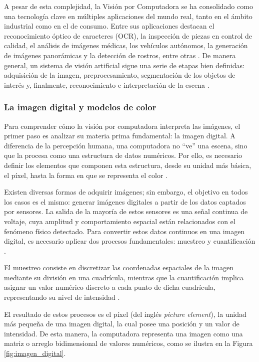 	A pesar de esta complejidad, la Visión por Computadora se ha consolidado como una tecnología clave en múltiples aplicaciones del mundo real, tanto en el ámbito industrial como en el de consumo. Entre sus aplicaciones destacan el reconocimiento óptico de caracteres (OCR), la inspección de piezas en control de calidad, el análisis de imágenes médicas, los vehículos autónomos, la generación de imágenes panorámicas y la detección de rostros, entre otras \cite{szeliski2022}. De manera general, un sistema de visión artificial sigue una serie de etapas bien definidas: adquisición de la imagen, preprocesamiento, segmentación de los objetos de interés y, finalmente, reconocimiento e interpretación de la escena \cite{cantero_vision}.
	
	\subsubsection{La imagen digital y modelos de color}
	
	Para comprender cómo la visión por computadora interpreta las imágenes, el primer paso es analizar su materia prima fundamental: la imagen digital. A diferencia de la percepción humana, una computadora no “ve” una escena, sino que la procesa como una estructura de datos numéricos. Por ello, es necesario definir los elementos que componen esta estructura, desde su unidad más básica, el píxel, hasta la forma en que se representa el color \cite{szeliski2022}.
	
	Existen diversas formas de adquirir imágenes; sin embargo, el objetivo en todos los casos es el mismo: generar imágenes digitales a partir de los datos captados por sensores. La salida de la mayoría de estos sensores es una señal continua de voltaje, cuya amplitud y comportamiento espacial están relacionados con el fenómeno físico detectado. Para convertir estos datos continuos en una imagen digital, es necesario aplicar dos procesos fundamentales: muestreo y cuantificación \cite{szeliski2022, gonzalez2018}.
	
	El muestreo consiste en discretizar las coordenadas espaciales de la imagen mediante su división en una cuadrícula, mientras que la cuantificación implica asignar un valor numérico discreto a cada punto de dicha cuadrícula, representando su nivel de intensidad \cite{gonzalez2018}.
	
	El resultado de estos procesos es el píxel (del inglés \textit{picture element}), la unidad más pequeña de una imagen digital, la cual posee una posición y un valor de intensidad. De esta manera, la computadora representa una imagen como una matriz o arreglo bidimensional de valores numéricos, como se ilustra en la Figura \ref{fig:imagen_digital}.
	
